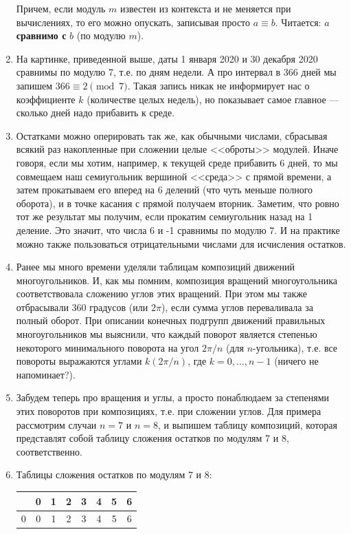 \begin{enumerate}
Причем, если модуль $m$ известен из контекста и не меняется при вычислениях, то его можно опускать, записывая просто $a\equiv b$. Читается: $a$ \textbf{сравнимо с} $b$ (по модулю $m$).

\item На картинке, приведенной выше, даты 1 января 2020 и 30 декабря 2020 сравнимы по модулю 7, т.е. по дням недели.
А про интервал в 366 дней мы запишем $366\equiv 2\pmod 7$. Такая запись никак не информирует нас о коэффициенте $k$ (количестве целых недель), но показывает самое главное --- сколько дней надо прибавить к среде.
\item Остатками можно оперировать так же, как обычными числами, сбрасывая всякий раз накопленные при сложении целые <<оброты>> модулей. Иначе говоря, если мы хотим, например, к текущей среде прибавить 6 дней, то мы совмещаем наш семиугольник вершиной <<среда>> с прямой времени, а затем прокатываем его вперед на 6 делений (что чуть меньше полного оборота), и в точке касания с прямой получаем вторник. Заметим, что ровно тот же результат мы получим, если прокатим семиугольник назад на 1 деление. Это значит, что числа 6 и -1 сравнимы по модулю 7. И на практике можно также пользоваться отрицательными числами для исчисления остатков.
\item Ранее мы много времени уделяли таблицам композиций движений многоугольников. И, как мы помним, композиция вращений многоугольника соответствовала сложению углов этих вращений. При этом мы также отбрасывали 360 градусов (или $2\pi$), если сумма углов переваливала за полный оборот. При описании конечных подгрупп движений правильных многоугольников мы выяснили, что каждый поворот является степенью некоторого минимального поворота на угол $2\pi/n$ (для $n$-угольника), т.е. все повороты выражаются углами $k(2\pi/n)$, где $k=0,\dots,n-1$ (ничего не напоминает?).
\item Забудем теперь про вращения и углы, а просто понаблюдаем за степенями этих поворотов при композициях, т.е. при сложении углов. Для примера рассмотрим случаи $n=7$ и $n=8$, и выпишем таблицу композиций, которая представлят собой таблицу сложения остатков по модулям 7 и 8, соответственно.
\item Таблицы сложения остатков по модулям 7 и 8:
\begin{center}
\begin{tabular}{c||c|c|c|c|c|c|c|}
  & 0 & 1 & 2 & 3 & 4 & 5 & 6 \\ \hline\hline
0 & 0 & 1 & 2 & 3 & 4 & 5 & 6 \\ \hline

\end{tabular}
\end{center}
\end{enumerate}
